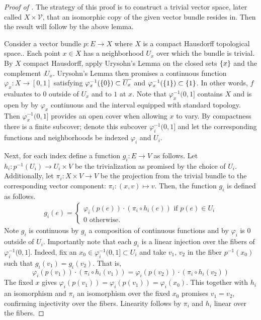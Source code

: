 \documentclass[../../sean_thesis.tex]{subfiles}
\begin{document}
	\begin{proof}[Proof of ]
		The strategy of this proof is to construct a trivial vector space, later called $X \times \mathcal{V}$, that an isomorphic copy of the given vector bundle resides in. Then the result will follow by the above lemma.
	
		Consider a vector bundle $p: E \to X$ where $X$ is a compact Hausdorff topological space.. Each point $x \in X$ has a neighborhood $U_x$ over which the bundle is trivial. By $X$ compact Hausdorff, apply Urysohn's Lemma  on the closed sets $\left\{x\right\}$ and the complement $\comp{U_x}$. Urysohn's Lemma then promises a continuous function $\varphi_x: X \to [0,1]$ satisfying $\varphi_x^{-1}(\left\{0\right\}) \subset \overline{U_x}$ and $\varphi_x^{-1}(\left\{1\right\}) \subset \left\{1\right\}$. In other words, $f$ evaluates to $0$ outside of $U_x$ and to $1$ at $x$. Note that $\varphi_x^{-1}(0,1]$ contains $X$ and is open by by $\varphi_x$ continuous and the interval equipped with standard topology. Then $\varphi_x^{-1}(0,1]$ provides an open cover when allowing $x$ to vary. By compactness there is a finite subcover; denote this subcover $\varphi_i^{-1}(0,1]$ and let the corresponding functions and neighborhoods be indexed $\varphi_i$ and $U_i$.
		
		Next, for each index define a function $g_i: E \to V$ as follows. Let $h_i: p^{-1}(U_i) \to U_i \times V$ be the  trivialization as promised by the choice of $U_i$.  Additionally, let $\pi_i: X \times V \to V$ be the projection from the trivial bundle to the corresponding vector component: $\pi_i: (x,v) \mapsto v$. Then, the function $g_i$ is defined as follows.
		\begin{align*}
			g_i(e) =
			\begin{cases}			
			 \varphi_i(p(e)) \cdot (\pi_i \circ h_i(e)) \text { if } p(e) \in U_i \\
			 0 \text{ otherwise. }
			 \end{cases}
		\end{align*} 
		Note $g_i$ is continuous by $g_i$ a composition of continuous functions and by $\varphi_i$ is $0$ outside of $U_i$. Importantly note that each $g_i$ is a linear injection over the fibers of $\varphi_i^{-1}(0,1]$. Indeed, fix an $x_0 \in \varphi_i^{-1}(0,1] \subset U_i$ and take $v_1$, $v_2$ in the fiber $p^{-1}(x_0)$ such that $g_i(v_1) = g_i(v_2)$. That is,
		\begin{equation*}
			\varphi_i(p(v_1)) \cdot (\pi_i \circ h_i(v_1))
			=
			\varphi_i(p(v_2)) \cdot (\pi_i \circ h_i(v_2))
		\end{equation*}
	The fixed $x$ gives $\varphi_i(p(v_1)) = \varphi_i(p(v_1)) = \varphi_i(x_0)$. This together with $h_i$ an isomorphism and $\pi_i$ an isomorphism over the fixed $x_0$ promises $v_1 = v_2$, confirming injectivity over the fibers. Linearity follows by $\pi_i$ and $h_i$ linear over the fibers.
	

\end{proof}
\end{document}
